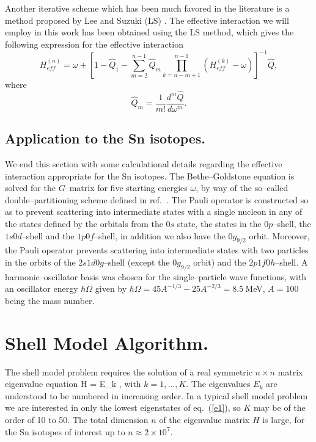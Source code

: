 Another iterative scheme which has been much favored in the literature
is a method proposed by Lee and Suzuki (LS) \cite{ls80}. The effective interaction
we will employ in this work has been obtained using the LS method, which
gives the following expression for the effective interaction
%
\begin{equation}
H_{eff}^{(n)} =  \omega + \left[1-\hat{Q}_{1}-\sum_{m=2}^{n-1}\hat{Q}_{m}
\prod_{k=n-m+1}^{n-1} \left ( H_{eff}^{(k)} - \omega \right )
              \right]^{-1}\hat{Q},
\end{equation}
where
\begin{equation}
\hat{Q}_{m}=\frac{1}{m!}\frac{d^m\hat{Q}}{d\omega^m}.
\end{equation}
%
\subsection{Application to the Sn isotopes.}
%
We end this section with some calculational details regarding
the effective interaction appropriate for the Sn isotopes.
The Bethe--Goldstone equation is solved
for the $G$--matrix for five starting
energies $\omega$, by way of the so--called double--partitioning scheme
defined in ref.~\cite{kkko76}. The Pauli operator is constructed so as to
prevent scattering into intermediate states with a single
nucleon in any of the
states defined by the orbitals from the $0s$ state, the states
in the $0p$--shell, the
$1s0d$--shell and the $1p0f$--shell, in addition we also have the $0g_{9/2}$
orbit. Moreover, the Pauli operator prevents scattering into intermediate
states with two particles in the orbits of the $2s1d0g$--shell (except the $0g_{9/2}$
orbit) and the $2p1f0h$--shell.
A harmonic--oscillator basis was chosen for the
single--particle wave functions, with an oscillator energy $\hbar\Omega$ given
by
$\hbar\Omega = 45A^{-1/3} - 25A^{-2/3}= 8.5~$MeV,  $A=100$ being the mass
number.
%
\section{Shell Model Algorithm.}
%
The shell model problem requires the solution of a real symmetric
$n \times n$ matrix eigenvalue equation
\be
H = E_k ,
\label{e1}
\ee
with $k = 1,\ldots, K$. The eigenvalues $E_k$ are understood to be
numbered in increasing order. In a typical shell model problem
we are interested in only the lowest eigenstates of eq.~(\ref{e1}),
so $K$ may be of the order of 10 to 50.
The total dimension $n$ of the eigenvalue matrix $H$ is large,
for the Sn isotopes of interest up to $n \approx 2 \times 10^{7}$.

